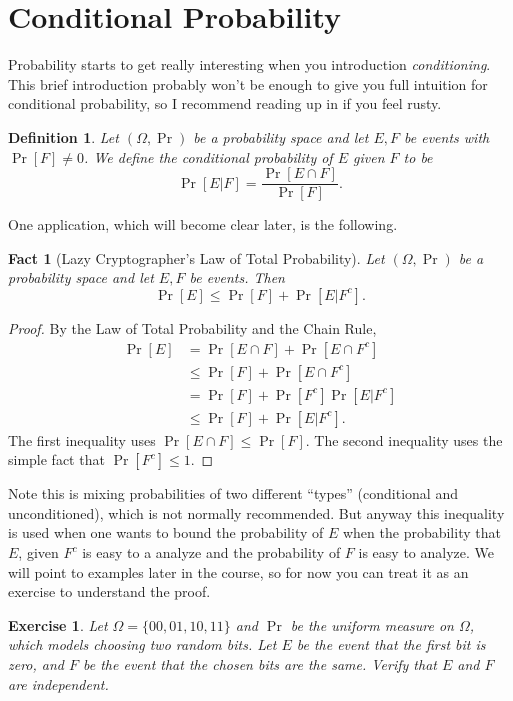 \documentclass[11pt]{article}
\newtheorem{fact}{Fact}
\newtheorem{exercise}{Exercise}
\newtheorem{definition}{Definition}
\begin{document}
\section{Conditional Probability}

Probability starts to get really interesting when you introduction
\emph{conditioning}. This brief introduction probably won't be enough
to give you full intuition for conditional probability, so I recommend
reading up in \cite{?} if you feel rusty.

\begin{definition}
    Let $(\Omega,\Pr)$ be a probability space 
    and let $E,F$ be events with $\Pr[F] \neq 0$. We define
    the \emph{conditional probability of $E$ given $F$} to be
    \[
        \Pr[E|F] = \frac{\Pr[E\cap F]}{\Pr[F]}.
    \]
\end{definition}


One application, which will become clear later, is the following.
\begin{fact}[Lazy Cryptographer's Law of Total Probability]
    Let $(\Omega,\Pr)$ be a probability space and let $E,F$ be events. Then
    \[
        \Pr[E] \leq \Pr[F] + \Pr[E|F^c].
    \]
\end{fact}

\begin{proof}
    By the Law of Total Probability and the Chain Rule,
    \begin{align*}
        \Pr[E] &= \Pr[E\cap F] + \Pr[E \cap F^c] \\
        & \leq \Pr[F] + \Pr[E \cap F^c] \\
        & = \Pr[F] + \Pr[F^c]\Pr[E|F^c] \\
        & \leq \Pr[F] + \Pr[E|F^c].
    \end{align*}
    The first inequality uses $\Pr[E\cap F] \leq \Pr[F]$. The
    second inequality uses the simple fact that $\Pr[F^c] \leq 1$.
\end{proof}
Note this is mixing probabilities of two different ``types'' (conditional and
unconditioned), which is not normally recommended. But anyway this inequality
is used when one wants to bound the probability of $E$ when the probability
that $E$, given $F^c$ is easy to a analyze and the probability of $F$ is easy
to analyze. We will point to examples later in the course, so for now you can
treat it as an exercise to understand the proof.

\begin{exercise}
    Let $\Omega=\{00,01,10,11\}$ and $\Pr$ be the uniform measure on $\Omega$,
    which models choosing two random bits.
    Let $E$ be the event that the  first bit is zero, and $F$ be the
    event that the chosen bits are the same. Verify that $E$ and $F$ are
    independent.
\end{exercise}
\end{document}
